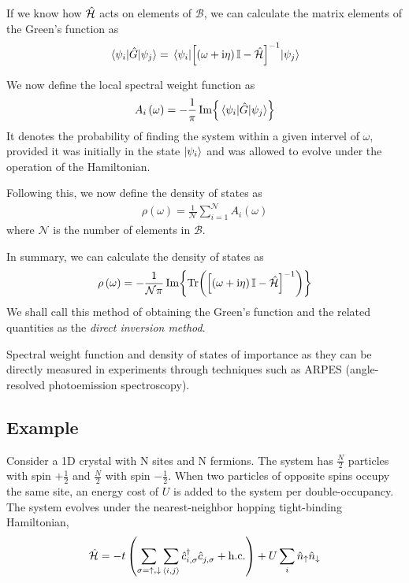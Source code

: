 	If we know how $ \hat{\mathcal{H}} $ acts on elements of $ \mathcal{B} $, we can calculate the matrix elements of the Green's function as
	\begin{align}
		\mel{\psi_i}{\hat{G}}{\psi_j} = \mel{\psi_i}{\left[ \left( \omega + \mathrm{i}\eta\right) \mathbb{I} - \hat{\mathcal{H}}\right]^{-1}}{\psi_j}
	\end{align}
	
	We now define the local spectral weight function as
	\begin{align}
		A_{i} \left( \omega \right) = -\frac{1}{\pi} \Im{ {\mel{\psi_i}{\hat{G}}{\psi_j}} }
	\end{align}
	It denotes the probability of finding the system within a given intervel of $ \omega $, provided it was initially in the state $ \ket{\psi_i} $ and was allowed to evolve under the operation of the Hamiltonian.
	
	Following this, we now define the density of states as
	\begin{align}
		\rho \left( \omega \right) = \frac{1}{\mathcal{N}} \sum_{i = 1}^{\mathcal{N}} A_{i} \left( \omega \right)
	\end{align}
	where $ \mathcal{N} $ is the number of elements in $ \mathcal{B} $.
	
	In summary, we can calculate the density of states as
	\begin{align}
		\rho \left( \omega \right) = -\frac{1}{\mathcal{N \pi}} \Im{ \Tr( \left[ \left( \omega + \mathrm{i}\eta\right) \mathbb{I} - \hat{\mathcal{H}}\right]^{-1} ) }
	\end{align}
	We shall call this method of obtaining the Green's function and the related quantities as the \emph{direct inversion method}.
	
	Spectral weight function and density of states of importance as they can be directly measured in experiments through techniques such as ARPES (angle-resolved photoemission spectroscopy).
	
	\subsection*{Example}
		Consider a 1D crystal with N sites and N fermions. The system has $ \tfrac{N}{2} $ particles with spin $ +\tfrac{1}{2} $ and $ \tfrac{N}{2} $ with spin $ -\tfrac{1}{2} $. When two particles of opposite spins occupy the same site, an energy cost of $ U $ is added to the system per double-occupancy. The system evolves under the nearest-neighbor hopping tight-binding Hamiltonian,
		\begin{align}\label{eqn:tight-binding-hamil}
			\hat{\mathcal{H}} = -t \left(\sum_{\sigma = \uparrow, \downarrow} \sum_{\expval{i,j}} \hat{c}^{\dagger}_{i, \sigma} \hat{c}^{}_{j, \sigma} + \mathrm{h.c.} \right) + U \sum_{i}\hat{n}_{\uparrow} \hat{n}_{\downarrow}
		\end{align}
		
